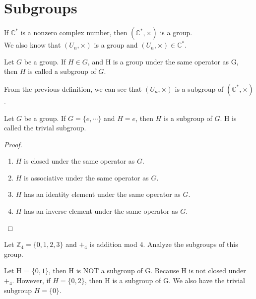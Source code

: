 \section{Subgroups}

\begin{prev}
    If $\mathbb{C}^{*}$ is a nonzero complex number, then $(\mathbb{C}^{*}, \times)$ is a group.\\
    We also know that $(U_n, \times)$ is a group and $(U_n, \times) \in \mathbb{C}^{*}$.
\end{prev}

\begin{definition}
    Let $G$ be a group. If $H \in G$, and H is a group under the same operator as G, then $H$ is called a subgroup of $G$.
\end{definition}

\begin{remark}
    From the previous definition, we can see that $(U_n, \times)$ is a subgroup of $(\mathbb{C}^{*}, \times)$.
\end{remark}

\begin{eg}
     Let $G$ be a group. If $G = \{e, \cdots \}$ and $H = {e}$, then $H$ is a subgroup of $G$.
     H is called the trivial subgroup.  
\end{eg}
\begin{proof}
    \vphantom{}\\
    \begin{enumerate}
        \item $H$ is closed under the same operator as $G$.
        \item $H$ is associative under the same operator as $G$.
        \item $H$ has an identity element under the same operator as $G$.
        \item $H$ has an inverse element under the same operator as $G$.
    \end{enumerate}
\end{proof}

\begin{exercise}
    Let $\mathbb{Z}_4 = \{0, 1, 2, 3\}$ and $+_4$ is addition mod 4. Analyze the subgroups of this group.
\end{exercise}
\begin{answer}
    Let H = $\{0, 1\}$, then H is NOT a subgroup of G. Because H is not closed under $+_4$.
    However, if $H = \{0, 2\}$, then H is a subgroup of G. We also have the trivial subgroup $H = \{0\}$.
\end{answer}

